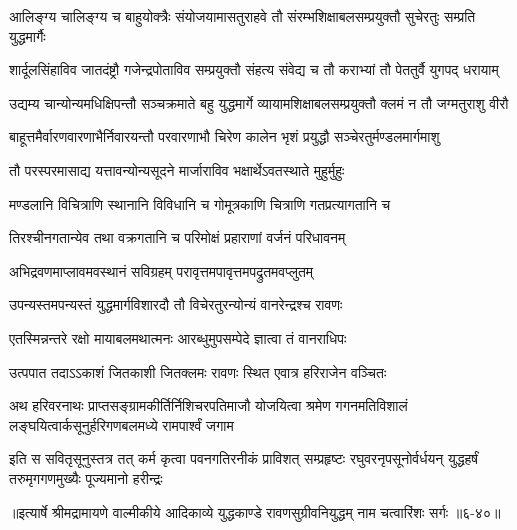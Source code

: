 \twolineshloka
{आलिङ्ग्य चालिङ्ग्य च बाहुयोक्त्रैः संयोजयामासतुराहवे तौ}
{संरम्भशिक्षाबलसम्प्रयुक्तौ सुचेरतुः सम्प्रति युद्धमार्गैः} %

\twolineshloka
{शार्दूलसिंहाविव जातदंष्ट्रौ गजेन्द्रपोताविव सम्प्रयुक्तौ}
{संहत्य संवेद्य च तौ कराभ्यां तौ पेततुर्वै युगपद् धरायाम्} %

\twolineshloka
{उद्यम्य चान्योन्यमधिक्षिपन्तौ सञ्चक्रमाते बहु युद्धमार्गे}
{व्यायामशिक्षाबलसम्प्रयुक्तौ क्लमं न तौ जग्मतुराशु वीरौ} %

\twolineshloka
{बाहूत्तमैर्वारणवारणाभैर्निवारयन्तौ परवारणाभौ}
{चिरेण कालेन भृशं प्रयुद्धौ सञ्चेरतुर्मण्डलमार्गमाशु} %

\twolineshloka
{तौ परस्परमासाद्य यत्तावन्योन्यसूदने}
{मार्जाराविव भक्षार्थेऽवतस्थाते मुहुर्मुहुः} %

\twolineshloka
{मण्डलानि विचित्राणि स्थानानि विविधानि च}
{गोमूत्रकाणि चित्राणि गतप्रत्यागतानि च} %

\twolineshloka
{तिरश्चीनगतान्येव तथा वक्रगतानि च}
{परिमोक्षं प्रहाराणां वर्जनं परिधावनम्} %

\twolineshloka
{अभिद्रवणमाप्लावमवस्थानं सविग्रहम्}
{परावृत्तमपावृत्तमपद्रुतमवप्लुतम्} %

\twolineshloka
{उपन्यस्तमपन्यस्तं युद्धमार्गविशारदौ}
{तौ विचेरतुरन्योन्यं वानरेन्द्रश्च रावणः} %

\twolineshloka
{एतस्मिन्नन्तरे रक्षो मायाबलमथात्मनः}
{आरब्धुमुपसम्पेदे ज्ञात्वा तं वानराधिपः} %

\twolineshloka
{उत्पपात तदाऽऽकाशं जितकाशी जितक्लमः}
{रावणः स्थित एवात्र हरिराजेन वञ्चितः} %

\twolineshloka
{अथ हरिवरनाथः प्राप्तसङ्ग्रामकीर्तिर्निशिचरपतिमाजौ योजयित्वा श्रमेण}
{गगनमतिविशालं लङ्घयित्वार्कसूनुर्हरिगणबलमध्ये रामपार्श्वं जगाम} %

\twolineshloka
{इति स सवितृसूनुस्तत्र तत् कर्म कृत्वा पवनगतिरनीकं प्राविशत् सम्प्रहृष्टः}
{रघुवरनृपसूनोर्वर्धयन् युद्धहर्षं तरुमृगगणमुख्यैः पूज्यमानो हरीन्द्रः} %


॥इत्यार्षे श्रीमद्रामायणे वाल्मीकीये आदिकाव्ये युद्धकाण्डे रावणसुग्रीवनियुद्धम् नाम चत्वारिंशः सर्गः ॥६-४०॥
